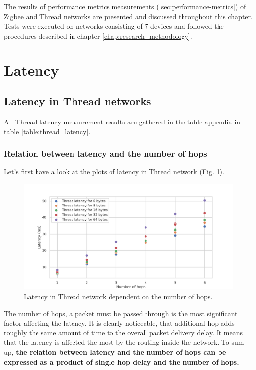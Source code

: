 
The results of performance metrics  
measurements (\ref{sec:performance-metrics}) of Zigbee and Thread
networks are presented and discussed throughout this chapter. Tests
were executed on networks consisting of 7 devices
and followed the procedures described in chapter \ref{chap:research_methodology}.

\section{Latency}
\label{sec:latency}

\subsection{Latency in Thread networks}

All Thread latency measurement results are gathered in the table 
appendix in table \ref{table:thread_latency}.

\subsubsection*{Relation between latency and the number of hops}

Let's first have a look at the plots of latency in Thread network 
(Fig. \ref{fig:thread_latency_all}).

\begin{figure}[H]
    \centering
    \includegraphics[scale=0.45]{images/Thread_Latency_all.png}
    \caption{Latency in Thread network dependent on the number of hops.}
    \label{fig:thread_latency_all}
\end{figure}

The number of hops, a packet must be passed through is the most
significant factor affecting the latency. It is clearly noticeable,
that additional hop adds roughly the same amount of time
to the overall packet delivery delay. It means that the latency is affected the most  
by the routing inside the network. To sum up, \textbf{the relation
between latency and the number of hops can be expressed as a
product of single hop delay and the number of hops.}

